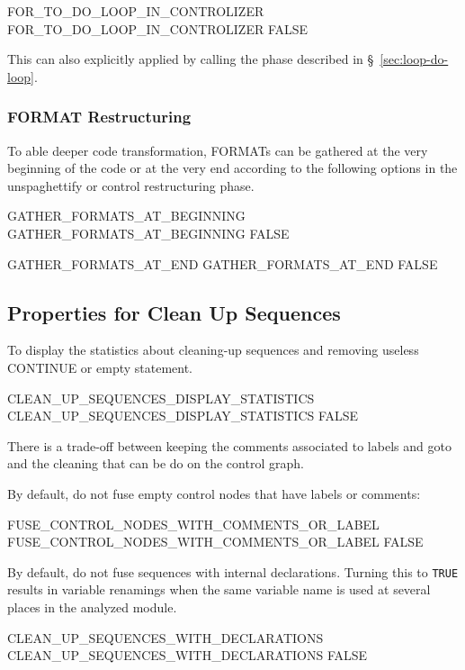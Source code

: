 \documentclass[a4paper]{report}
\begin{document}
\begin{PipsProp}{FOR_TO_DO_LOOP_IN_CONTROLIZER}
FOR_TO_DO_LOOP_IN_CONTROLIZER FALSE
\end{PipsProp}

This can also explicitly applied by calling the phase described in
\S~\ref{sec:loop-do-loop}.


\subsubsection*{FORMAT Restructuring}

To able deeper code transformation, FORMATs can be gathered at the
very beginning of the code or at the very end according to the
following options in the unspaghettify or control restructuring phase.
\begin{PipsProp}{GATHER_FORMATS_AT_BEGINNING}
GATHER_FORMATS_AT_BEGINNING FALSE
\end{PipsProp}
\begin{PipsProp}{GATHER_FORMATS_AT_END}
GATHER_FORMATS_AT_END FALSE
\end{PipsProp}


\subsection{Properties for Clean Up Sequences}


To display the statistics about cleaning-up sequences and removing
useless CONTINUE or empty statement.
\begin{PipsProp}{CLEAN_UP_SEQUENCES_DISPLAY_STATISTICS}
CLEAN_UP_SEQUENCES_DISPLAY_STATISTICS FALSE
\end{PipsProp}

There is a trade-off between keeping the comments associated to labels and
goto and the cleaning that can be do on the control graph.

By default, do not fuse empty control nodes that have labels or comments:
\begin{PipsProp}{FUSE_CONTROL_NODES_WITH_COMMENTS_OR_LABEL}
FUSE_CONTROL_NODES_WITH_COMMENTS_OR_LABEL FALSE
\end{PipsProp}

By default, do not fuse sequences with internal declarations. Turning
this to \texttt{TRUE} results in variable renamings when the same
variable name is used at several places in the analyzed module.
\begin{PipsProp}{CLEAN_UP_SEQUENCES_WITH_DECLARATIONS}
CLEAN_UP_SEQUENCES_WITH_DECLARATIONS FALSE
\end{PipsProp}
\end{document}
